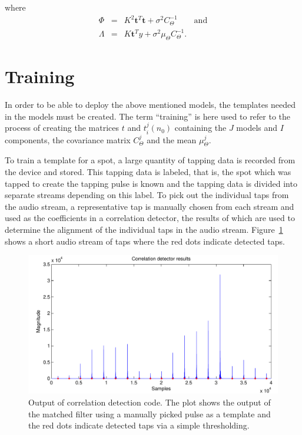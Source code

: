 where
\begin{eqnarray}
\label{eq:z3K}
\Phi &=& K^2 \textbf{t}^T\textbf{t} + \sigma^2C_\Theta^{-1} \qquad \textrm{and}\\\nonumber
\Lambda &=& K \textbf{t}^Ty + \sigma^2\mu_\Theta C_\Theta^{-1}.
\end{eqnarray}

\section{Training}\label{sec:APRtraining}
In order to be able to deploy the above mentioned models, the templates needed in the models must be created. The term ``training'' is here used to refer to the process of creating the matrices $t$ and $t^j_i(n_0)$ containing the $J$ models and $I$ components, the covariance matrix $C^j_\Theta$ and the mean $\mu^j_\Theta$.

To train a template for a spot, a large quantity of tapping data is recorded from the device and stored. This tapping data is labeled, that is, the spot which was tapped to create the tapping pulse is known and the tapping data is divided into separate streams depending on this label. To pick out the individual taps from the audio stream, a representative tap is manually chosen from each stream and used as the coefficients in a correlation detector, the results of which are used to determine the alignment of the individual taps in the audio stream. \DIFaddbegin {}\DIFaddend Figure~\ref{fig:correlationDetect} shows a short audio stream of taps where the red dots indicate detected taps.

\begin{figure}[!]
\centering
\includegraphics[width=150mm]{correlationDetect.pdf}
\caption{Output of correlation detection code\DIFdelbeginFL \DIFdelFL{)}\DIFdelendFL . The plot shows the output of the matched filter using a manually picked pulse as a template and the red dots indicate detected taps via a simple thresholding.}\label{fig:correlationDetect}
\end{figure}

